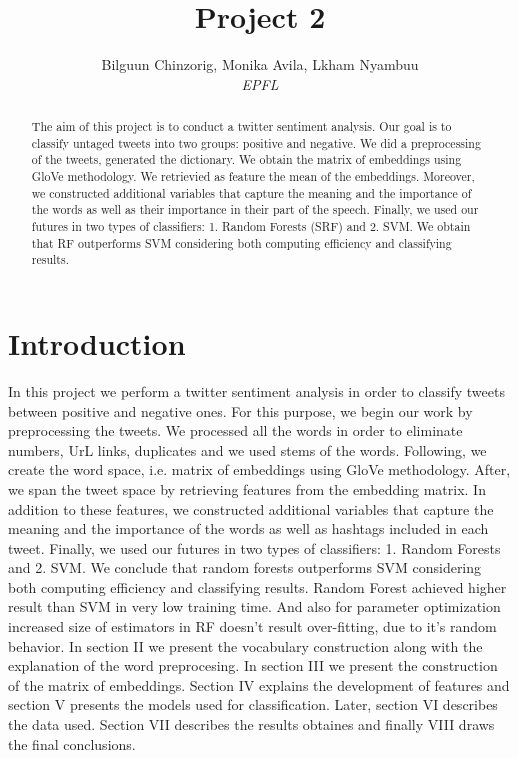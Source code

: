\documentclass[10pt,conference,compsocconf]{IEEEtran}
\begin{document}
\title{Project 2}

\author{
Bilguun Chinzorig, Monika Avila, Lkham Nyambuu\\
  \textit{EPFL}
}

\maketitle

\begin{abstract}
  The aim of this project is to conduct a twitter sentiment analysis. Our goal is to classify untaged tweets into two groups: positive and negative. 
  We  did a preprocessing of the tweets, generated the dictionary. We obtain the matrix of embeddings using GloVe methodology. We retrievied as feature the mean of the embeddings. Moreover, we constructed additional variables that capture the meaning  and the importance of the words as well as their importance in their part of the speech. Finally, we used our futures in two types of classifiers: 1. Random Forests (SRF) and 2. SVM. 
  We obtain that RF outperforms SVM considering both computing efficiency and classifying results. 
\end{abstract}	\textbf{ }

\section{Introduction}


In this project we perform a twitter sentiment analysis in order to classify tweets between positive and negative ones. 
For this purpose, we begin our work by preprocessing the tweets. We processed all the words in order to eliminate numbers, UrL links, duplicates and we used stems of the words. Following, we create the word space, i.e. matrix of embeddings using GloVe methodology. After, we span the tweet space by retrieving features from the embedding matrix. In addition to these features, we constructed additional variables that capture the meaning  and the importance of the words as well as hashtags included in each tweet. Finally, we used our futures in two types of classifiers: 1. Random Forests and 2. SVM. 
We conclude that random forests outperforms SVM considering both computing efficiency and classifying results. 
Random Forest achieved higher result than SVM in very low training time. And also for parameter optimization increased size of estimators in RF doesn't result over-fitting, due to it's random behavior. 
In section II we present the vocabulary construction along with the explanation of the word preprocesing. In section III we present the construction of the matrix of embeddings. Section IV explains the development of features and section V presents the models used for classification. Later, section VI describes the data used. Section VII describes the results obtaines and finally VIII draws the final conclusions. 
\end{document}
